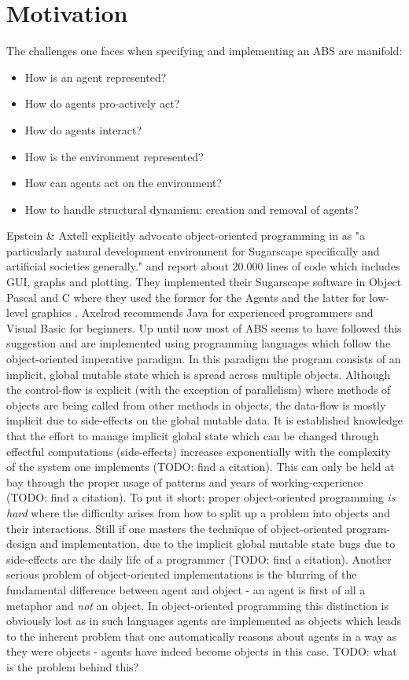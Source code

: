 \section{Motivation}
The challenges one faces when specifying and implementing an ABS are manifold:

\begin{itemize}
	\item How is an agent represented?
	\item How do agents pro-actively act?
	\item How do agents interact?
	\item How is the environment represented?
	\item How can agents act on the environment?
	\item How to handle structural dynamism: creation and removal of agents?
\end{itemize}

Epstein \& Axtell explicitly advocate object-oriented programming in \cite{epstein_growing_1996} as "a particularly natural development environment for Sugarscape specifically and artificial societies generally." and report about 20.000 lines of code which includes GUI, graphs and plotting. They implemented their Sugarscape software in Object Pascal and C where they used the former for the Agents and the latter for low-level graphics \cite{axtell_aligning_1996}. Axelrod \cite{axelrod_advancing_1997} recommends Java for experienced programmers and Visual Basic for beginners. Up until now most of ABS seems to have followed this suggestion and are implemented using programming languages which follow the object-oriented imperative paradigm. In this paradigm the program consists of an implicit, global mutable state which is spread across multiple objects. Although the control-flow is explicit (with the exception of parallelism) where methods of objects are being called from other methods in objects, the data-flow is mostly implicit due to side-effects on the global mutable data.
It is established knowledge that the effort to manage implicit global state which can be changed through effectful computations (side-effects) increases exponentially with the complexity of the system one implements (TODO: find a citation). This can only be held at bay through the proper usage of patterns \cite{gamma_design_1994} and years of working-experience (TODO: find a citation). To put it short: proper object-oriented programming \textit{is hard} where the difficulty arises from how to split up a problem into objects and their interactions. Still if one masters the technique of object-oriented program-design and implementation, due to the implicit global mutable state bugs due to side-effects are the daily life of a programmer (TODO: find a citation). Another serious problem of object-oriented implementations is the blurring of the fundamental difference between agent and object - an agent is first of all a metaphor and \textit{not} an object. In object-oriented programming this distinction is obviously lost as in such languages agents are implemented as objects which leads to the inherent problem that one automatically reasons about agents in a way as they were objects - agents have indeed become objects in this case. TODO: what is the problem behind this?

